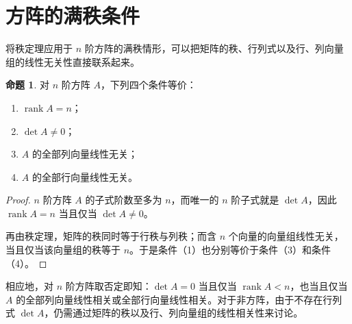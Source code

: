 \documentclass[UTF8, fontset=fandol, a4paper, 12pt]{ctexart}
\newcommand{\rank}{\operatorname{rank}}
\theoremstyle{definition}
\newtheorem{proposition}[definition]{命题}
\begin{document}
\section{方阵的满秩条件}

将秩定理应用于 $n$ 阶方阵的满秩情形，可以把矩阵的秩、行列式以及行、列向量组的线性无关性直接联系起来。

\begin{proposition}
对 $n$ 阶方阵 $A$，下列四个条件等价：
\begin{enumerate}
 \item $\rank A=n$；
 \item $\det A\ne0$；
 \item $A$ 的全部列向量线性无关；
 \item $A$ 的全部行向量线性无关。
\end{enumerate}
\end{proposition}
\begin{proof}
$n$ 阶方阵 $A$ 的子式阶数至多为 $n$，而唯一的 $n$ 阶子式就是 $\det A$，因此 $\rank A=n$ 当且仅当 $\det A\ne0$。

再由秩定理，矩阵的秩同时等于行秩与列秩；而含 $n$ 个向量的向量组线性无关，当且仅当该向量组的秩等于 $n$。于是条件（1）也分别等价于条件（3）和条件（4）。
\end{proof}

相应地，对 $n$ 阶方阵取否定即知：$\det A=0$ 当且仅当 $\rank A<n$，也当且仅当 $A$ 的全部列向量线性相关或全部行向量线性相关。对于非方阵，由于不存在行列式 $\det A$，仍需通过矩阵的秩以及行、列向量组的线性相关性来讨论。
\end{document}
